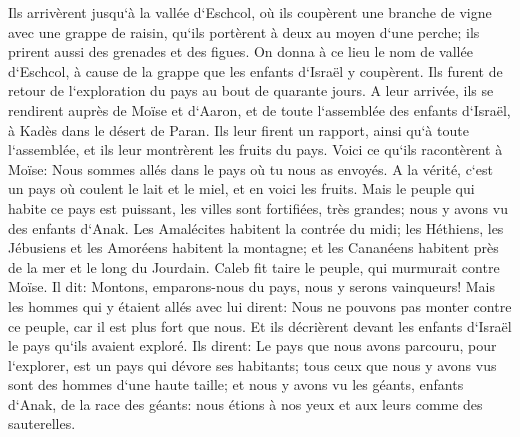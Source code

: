 \verse Ils arrivèrent jusqu`à la vallée d`Eschcol, où ils coupèrent une branche de vigne avec une grappe de raisin, qu`ils portèrent à deux au moyen d`une perche; ils prirent aussi des grenades et des figues. 
\verse On donna à ce lieu le nom de vallée d`Eschcol, à cause de la grappe que les enfants d`Israël y coupèrent. 
\verse Ils furent de retour de l`exploration du pays au bout de quarante jours. 
\verse A leur arrivée, ils se rendirent auprès de Moïse et d`Aaron, et de toute l`assemblée des enfants d`Israël, à Kadès dans le désert de Paran. Ils leur firent un rapport, ainsi qu`à toute l`assemblée, et ils leur montrèrent les fruits du pays. 
\verse Voici ce qu`ils racontèrent à Moïse: Nous sommes allés dans le pays où tu nous as envoyés. A la vérité, c`est un pays où coulent le lait et le miel, et en voici les fruits. 
\verse Mais le peuple qui habite ce pays est puissant, les villes sont fortifiées, très grandes; nous y avons vu des enfants d`Anak. 
\verse Les Amalécites habitent la contrée du midi; les Héthiens, les Jébusiens et les Amoréens habitent la montagne; et les Cananéens habitent près de la mer et le long du Jourdain. 
\verse Caleb fit taire le peuple, qui murmurait contre Moïse. Il dit: Montons, emparons-nous du pays, nous y serons vainqueurs! 
\verse Mais les hommes qui y étaient allés avec lui dirent: Nous ne pouvons pas monter contre ce peuple, car il est plus fort que nous. 
\verse Et ils décrièrent devant les enfants d`Israël le pays qu`ils avaient exploré. Ils dirent: Le pays que nous avons parcouru, pour l`explorer, est un pays qui dévore ses habitants; tous ceux que nous y avons vus sont des hommes d`une haute taille; 
\verse et nous y avons vu les géants, enfants d`Anak, de la race des géants: nous étions à nos yeux et aux leurs comme des sauterelles. 

